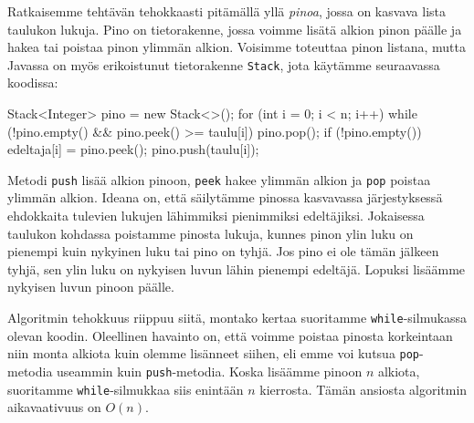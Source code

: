 Ratkaisemme tehtävän tehokkaasti pitämällä yllä \emph{pinoa},
jossa on kasvava lista taulukon lukuja.
Pino on tietorakenne, jossa voimme lisätä alkion pinon päälle
ja hakea tai poistaa pinon ylimmän alkion.
Voisimme toteuttaa pinon listana,
mutta Javassa on myös erikoistunut tietorakenne \texttt{Stack},
jota käytämme seuraavassa koodissa:

\begin{code}
Stack<Integer> pino = new Stack<>();
for (int i = 0; i < n; i++) {
    while (!pino.empty() && pino.peek() >= taulu[i]) {
        pino.pop();
    }
    if (!pino.empty()) {
        edeltaja[i] = pino.peek();
    }
    pino.push(taulu[i]);
}
\end{code}

Metodi \texttt{push} lisää alkion pinoon,
\texttt{peek} hakee ylimmän alkion ja \texttt{pop}
poistaa ylimmän alkion.
Ideana on, että säilytämme pinossa kasvavassa järjestyk\-sessä
ehdokkaita tulevien lukujen lähimmiksi pienimmiksi edeltäjiksi.
Jokaisessa taulukon kohdassa poistamme
pinosta lukuja, kunnes pinon ylin luku on pienempi kuin nykyinen luku
tai pino on tyhjä.
Jos pino ei ole tämän jälkeen tyhjä, sen ylin luku on nykyisen luvun
lähin pienempi edeltäjä.
Lopuksi lisäämme nykyisen luvun pinoon päälle.

Algoritmin tehokkuus riippuu siitä, montako kertaa suoritamme
\texttt{while}-silmukassa olevan koodin.
Oleellinen havainto on, että voimme poistaa pinosta
korkeintaan niin monta alkiota kuin olemme lisänneet siihen,
eli emme voi kutsua \texttt{pop}-metodia useammin kuin \texttt{push}-metodia.
Koska lisäämme pinoon $n$ alkiota, suoritamme \texttt{while}-silmukkaa
siis enintään $n$ kierrosta.
Tämän ansiosta algoritmin aikavaativuus on $O(n)$.